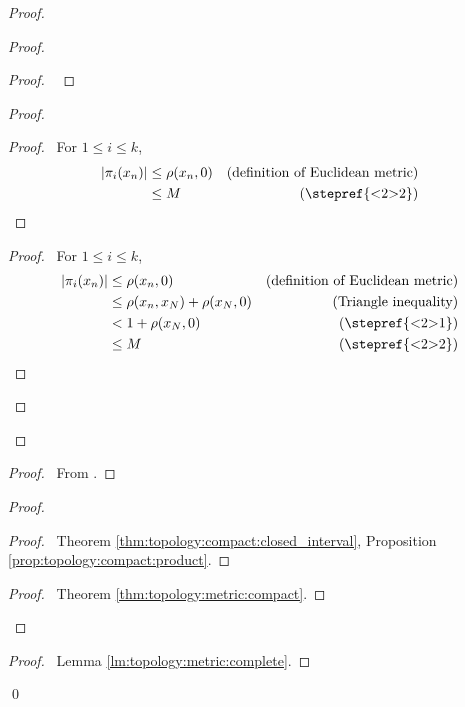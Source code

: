 \begin{proof}
  \pf
  \begin{proof}
    \begin{proof}
      \pf\ 
    \end{proof}
    \begin{proof}
      \begin{proof}
        \pf\ For $1 \leq i \leq k$,
        \begin{align*}
          |\pi_i(x_n)| & \leq \rho(x_n, 0) & (\text{definition of Euclidean metric})\\
          & \leq M & (\text{\stepref{<2>2}})
        \end{align*}
      \end{proof}
      \begin{proof}
        \pf\ For $1 \leq i \leq k$,
        \begin{align*}
          |\pi_i(x_n)| & \leq \rho(x_n, 0) & (\text{definition of Euclidean metric})\\
          & \leq \rho(x_n, x_N) + \rho(x_N, 0) & (\text{Triangle inequality}) \\
          & < 1 + \rho(x_N, 0) & (\text{\stepref{<2>1}})\\
          & \leq M & (\text{\stepref{<2>2}})
        \end{align*}
      \end{proof}
    \end{proof}
  \end{proof}
  \begin{proof}
    \pf\ From .
  \end{proof}
  \begin{proof}
    \begin{proof}
      \pf\ Theorem \ref{thm:topology:compact:closed_interval}, Proposition \ref{prop:topology:compact:product}.
    \end{proof}
    \qedstep
    \begin{proof}
      \pf\ Theorem \ref{thm:topology:metric:compact}.
    \end{proof}
  \end{proof}
  \qedstep
  \begin{proof}
    \pf\ Lemma \ref{lm:topology:metric:complete}.
  \end{proof}
  \qed
\end{proof}

